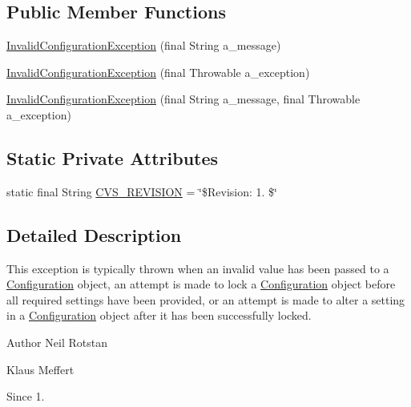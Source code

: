 \subsection*{Public Member Functions}
\begin{DoxyCompactItemize}
\item 
\hyperlink{classorg_1_1jgap_1_1_invalid_configuration_exception_a28b263b3c7252ac48ca798e519741189}{Invalid\-Configuration\-Exception} (final String a\-\_\-message)
\item 
\hyperlink{classorg_1_1jgap_1_1_invalid_configuration_exception_a74bf66d658a4c27074f38d354782bfc6}{Invalid\-Configuration\-Exception} (final Throwable a\-\_\-exception)
\item 
\hyperlink{classorg_1_1jgap_1_1_invalid_configuration_exception_ab230b10b23f7d992c7e16dba652f48a9}{Invalid\-Configuration\-Exception} (final String a\-\_\-message, final Throwable a\-\_\-exception)
\end{DoxyCompactItemize}
\subsection*{Static Private Attributes}
\begin{DoxyCompactItemize}
\item 
static final String \hyperlink{classorg_1_1jgap_1_1_invalid_configuration_exception_ac2b20ece5c19cc10c6387dc24ce5f6bd}{C\-V\-S\-\_\-\-R\-E\-V\-I\-S\-I\-O\-N} = \char`\"{}\$Revision\-: 1. \$\char`\"{}
\end{DoxyCompactItemize}


\subsection{Detailed Description}
This exception is typically thrown when an invalid value has been passed to a \hyperlink{classorg_1_1jgap_1_1_configuration}{Configuration} object, an attempt is made to lock a \hyperlink{classorg_1_1jgap_1_1_configuration}{Configuration} object before all required settings have been provided, or an attempt is made to alter a setting in a \hyperlink{classorg_1_1jgap_1_1_configuration}{Configuration} object after it has been successfully locked.

\begin{DoxyAuthor}{Author}
Neil Rotstan 

Klaus Meffert 
\end{DoxyAuthor}
\begin{DoxySince}{Since}
1. 
\end{DoxySince}


